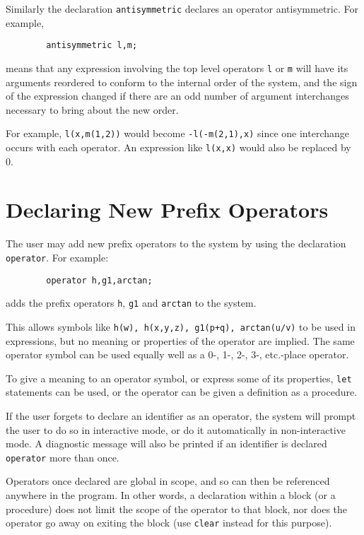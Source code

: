 Similarly the declaration \texttt{antisymmetric}
\hypertarget{reserved:ANTISYMMETRIC}{}
declares an operator antisymmetric.   For example,
\begin{verbatim}
        antisymmetric l,m;
\end{verbatim}
means that any expression involving the top level operators \texttt{l} or
\texttt{m} will have its arguments reordered to conform to the internal order
of the system, and the sign of the expression changed if there are an odd
number of argument interchanges necessary to bring about the new order.

For example, \texttt{l(x,m(1,2))} would become \texttt{-l(-m(2,1),x)} since one
interchange occurs with each operator.  An expression like \texttt{l(x,x)}
would also be replaced by 0.

\section{Declaring New Prefix Operators}
\hypertarget{command:OPERATOR}{}

The user may add new prefix operators to the system by
using the declaration \texttt{operator}.
For example:
\begin{verbatim}
        operator h,g1,arctan;
\end{verbatim}
adds the prefix operators \texttt{h}, \texttt{g1} and \texttt{arctan} to the system.

This allows symbols like \texttt{h(w), h(x,y,z), g1(p+q), arctan(u/v)} to be
used in expressions, but no meaning or properties of the operator are
implied.  The same operator symbol can be used equally well as a 0-, 1-, 2-,
3-, etc.-place operator.

To give a meaning to an operator symbol, or express some of its
properties, \texttt{let} statements can be used, or the operator
can be given a definition as a procedure.

If the user forgets to declare an identifier as an operator, the system
will prompt the user to do so in interactive mode, or do it automatically
in non-interactive mode. A diagnostic message will also be printed if an
identifier is declared \texttt{operator} more than once.

Operators once declared are global in scope, and so can then be referenced
anywhere in the program.  In other words, a declaration within a block (or
a procedure) does not limit the scope of the operator to that block, nor
does the operator go away on exiting the block (use \texttt{clear} instead
for this purpose).

